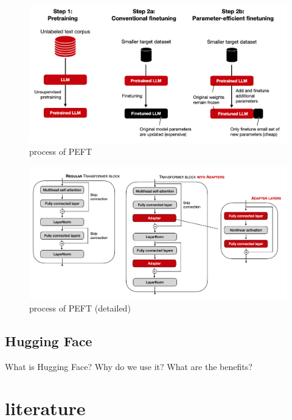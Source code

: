 \documentclass[conference]{IEEEtran}
\begin{document}
\begin{figure}[h!]
    \centering
    \includegraphics[width=.65\linewidth]{pictures/PEFT1.png}
    \caption[PEFT1]{process of PEFT  \cite{Raschka2023}}
    \label{fig:PEFT1}
\end{figure}

\begin{figure}[h!]
    \centering
    \includegraphics[width=.65\linewidth]{pictures/PEFT2.jpg}
    \caption[PEFT2]{process of PEFT (detailed) \cite{Raschka2023}}
    \label{fig:PEFT2}
\end{figure}   




\subsection{Hugging Face}%
What is Hugging Face? Why do we use it? What are the benefits?

\section{literature}%
\end{document}
